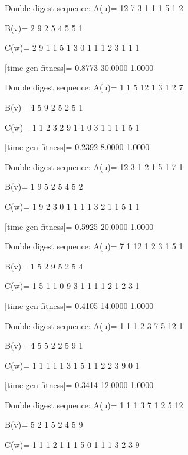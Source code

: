 Double digest sequence:
A(u)=
    12     7     3     1     1     1     5     1     2

B(v)=
     2     9     2     5     4     5     5     1

C(w)=
     2     9     1     1     5     1     3     0     1     1     1     2     3     1     1     1

[time gen fitness]=
    0.8773   30.0000    1.0000

Double digest sequence:
A(u)=
     1     1     5    12     1     3     1     2     7

B(v)=
     4     5     9     2     5     2     5     1

C(w)=
     1     1     2     3     2     9     1     1     0     3     1     1     1     1     5     1

[time gen fitness]=
    0.2392    8.0000    1.0000

Double digest sequence:
A(u)=
    12     3     1     2     1     5     1     7     1

B(v)=
     1     9     5     2     5     4     5     2

C(w)=
     1     9     2     3     0     1     1     1     1     3     2     1     1     5     1     1

[time gen fitness]=
    0.5925   20.0000    1.0000

Double digest sequence:
A(u)=
     7     1    12     1     2     3     1     5     1

B(v)=
     1     5     2     9     5     2     5     4

C(w)=
     1     5     1     1     0     9     3     1     1     1     1     2     1     2     3     1

[time gen fitness]=
    0.4105   14.0000    1.0000

Double digest sequence:
A(u)=
     1     1     1     2     3     7     5    12     1

B(v)=
     4     5     5     2     2     5     9     1

C(w)=
     1     1     1     1     1     3     1     5     1     1     2     2     3     9     0     1

[time gen fitness]=
    0.3414   12.0000    1.0000

Double digest sequence:
A(u)=
     1     1     1     3     7     1     2     5    12

B(v)=
     5     2     1     5     2     4     5     9

C(w)=
     1     1     1     2     1     1     1     5     0     1     1     1     3     2     3     9

